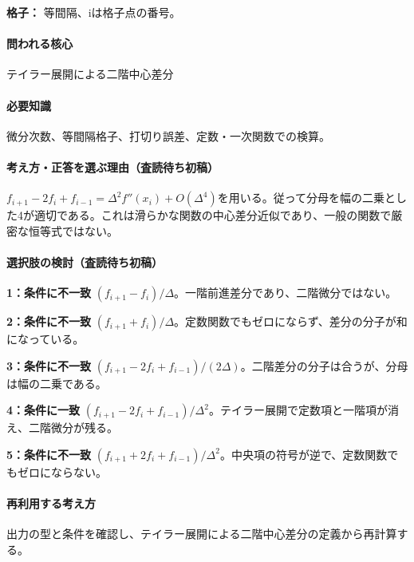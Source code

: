 \noindent\textbf{格子：} 等間隔、iは格子点の番号。\par

\paragraph{問われる核心} テイラー展開による二階中心差分

\paragraph{必要知識} 微分次数、等間隔格子、打切り誤差、定数・一次関数での検算。

\paragraph{考え方・正答を選ぶ理由（査読待ち初稿）} \(f_{i+1}-2f_i+f_{i-1}=\Delta^2f''(x_i)+O(\Delta^4)\)を用いる。従って分母を幅の二乗とした4が適切である。これは滑らかな関数の中心差分近似であり、一般の関数で厳密な恒等式ではない。

\paragraph{選択肢の検討（査読待ち初稿）}\mbox{}\par

\noindent\textbf{1：条件に不一致} \((f_{i+1}-f_i)/\Delta\)。一階前進差分であり、二階微分ではない。\par

\noindent\textbf{2：条件に不一致} \((f_{i+1}+f_i)/\Delta\)。定数関数でもゼロにならず、差分の分子が和になっている。\par

\noindent\textbf{3：条件に不一致} \((f_{i+1}-2f_i+f_{i-1})/(2\Delta)\)。二階差分の分子は合うが、分母は幅の二乗である。\par

\noindent\textbf{4：条件に一致} \((f_{i+1}-2f_i+f_{i-1})/\Delta^2\)。テイラー展開で定数項と一階項が消え、二階微分が残る。\par

\noindent\textbf{5：条件に不一致} \((f_{i+1}+2f_i+f_{i-1})/\Delta^2\)。中央項の符号が逆で、定数関数でもゼロにならない。\par

\paragraph{再利用する考え方} 出力の型と条件を確認し、テイラー展開による二階中心差分の定義から再計算する。

